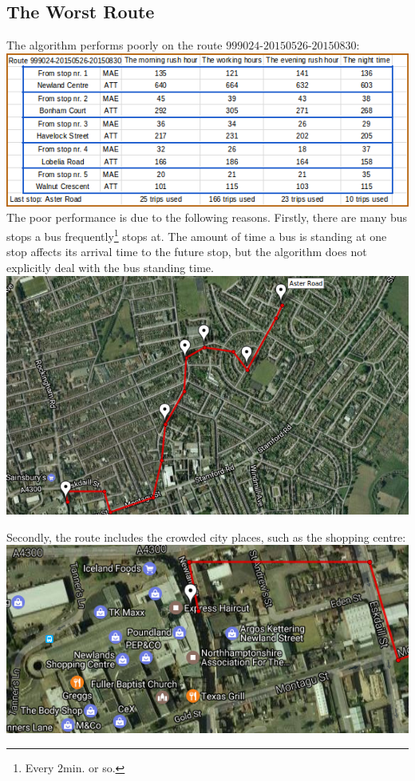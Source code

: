 \documentclass[12pt,a4paper,oneside,openright]{report}
\begin{document}
\subsection*{The Worst Route}

The algorithm performs poorly on the route $999024$-$20150526$-$20150830$: \\

\includegraphics[width=\textwidth]{figs/table_of_999024.png} \\

The poor performance is due to the following reasons. Firstly, there are many bus stops a bus
frequently\footnote{Every $2$min. or so.} stops at. The amount of time a bus is standing at one
stop affects its arrival time to the future stop, but the algorithm does not explicitly deal with
the bus standing time. \\

\includegraphics[scale=0.8]{figs/worst_route.png} \\

\newpage

Secondly, the route includes the crowded city places, such as the shopping centre: \\

\includegraphics[scale=0.6]{figs/shopping_centre.png} \\
\end{document}
